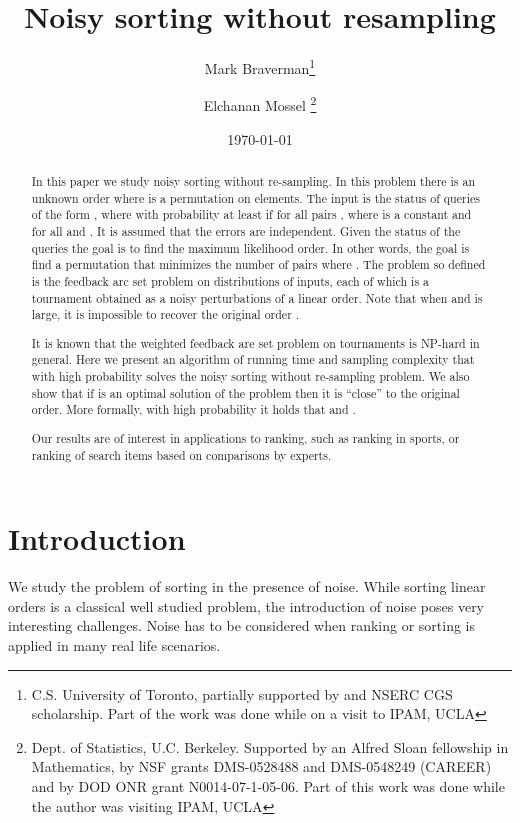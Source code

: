 \documentclass[11pt]{article}
\begin{document}
\title{Noisy sorting without resampling}
\author{Mark Braverman\thanks{C.S. University of Toronto, partially 
supported by and NSERC CGS scholarship. Part of the work was done
while on a visit to IPAM, UCLA}
\and Elchanan Mossel
\thanks{Dept. of
Statistics, U.C. Berkeley. Supported by an Alfred Sloan fellowship
in Mathematics, by NSF grants DMS-0528488
and DMS-0548249 (CAREER) and by DOD ONR grant N0014-07-1-05-06. 
Part of this work was done while the author was visiting IPAM, UCLA}}
\date{\today}

\maketitle

\begin{abstract}
In this paper we study noisy sorting without re-sampling. 
In this problem there is an unknown order 
 where  is a 
permutation on  elements. 
The input is the status of  
queries of the form , where   
with probability at least   if  
for all pairs , where  is a constant and 
 for all  and . It is assumed 
that the errors are independent. 
Given the status of the queries the goal is to find 
the maximum likelihood order. 
In other words, the goal is find a permutation  that minimizes 
the number of pairs  where 
. The problem so defined is 
the feedback arc set problem on 
distributions of inputs, each of which is a tournament 
obtained as a noisy perturbations of a linear 
order. Note that when  and  is large, 
it is impossible to recover the original order .

It is known that the weighted feedback are set problem on tournaments 
is NP-hard in general. Here we present an algorithm of running time 
 and sampling complexity  that 
with high probability solves the noisy sorting without re-sampling problem. 
We also show that if  is an optimal 
solution of the problem then it is ``close'' to the original order. 
More formally, with high probability it holds that  
 and 
. 

Our results are of interest in applications to ranking, such as ranking in sports, or ranking of search items based on comparisons by experts. 

 \end{abstract}


\newpage
\section{Introduction}
We study the problem of sorting in the presence of noise. 
While sorting linear orders is a classical well studied problem, 
the introduction of noise poses very interesting challenges. 
Noise has to be considered when ranking or sorting is applied in many 
real life scenarios. 
\end{document}
